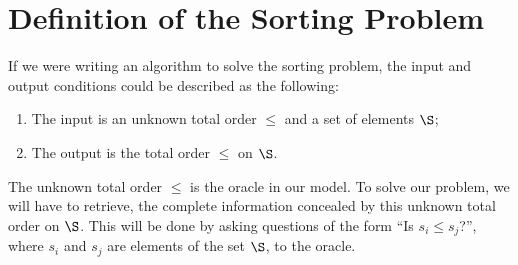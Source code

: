 \section{Definition of the Sorting Problem}
\label{tree:sorting:def}

If we were writing an algorithm to solve the sorting problem, the input and output
conditions could be described as the following:

\begin{enumerate}
\item The input is an unknown total order \(\le\) and a set of elements \(\S\);
\item The output is the total order \(\le\) on \(\S\).
\end{enumerate}

The unknown total order \(\le\) is the oracle in our model. To solve our
problem, we will have to retrieve, the complete information concealed by this
unknown total order on \(\S\). This will be done by asking questions of the
form ``Is \(s_i \le s_j\)?'', where \(s_i\) and \(s_j\) are elements of the set
\(\S\), to the oracle.

